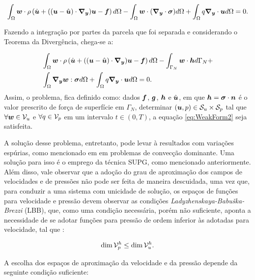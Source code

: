 \begin{equation}
    \int_{\Omega}{\boldsymbol{w}\cdot\rho\left({\dot{\boldsymbol{u}}+((\boldsymbol{u}-\hat{\boldsymbol{u}})\cdot\boldsymbol{\nabla_y})\boldsymbol{u}-\boldsymbol{f}}\right) d\Omega}-\int_{\Omega}{\boldsymbol{w}\cdot(\boldsymbol{\nabla_y}\cdot\boldsymbol{\sigma}) d\Omega}+\int_{\Omega}{q\boldsymbol{\nabla_y}\cdot\boldsymbol{u} d\Omega}=0\text{.}
    \label{eq:WeakForm1}
\end{equation}

Fazendo a integração por partes da parcela que foi separada e considerando o Teorema da Divergência, chega-se a:

\begin{equation}
    \begin{split}
        &\int_{\Omega}{\boldsymbol{w}\cdot\rho\left({\dot{\boldsymbol{u}}+((\boldsymbol{u}-\hat{\boldsymbol{u}})\cdot\boldsymbol{\nabla_y})\boldsymbol{u}-\boldsymbol{f}}\right) d\Omega}-\int_{\Gamma_N}{\boldsymbol{w}\cdot\boldsymbol{h} d\Gamma_N}+\\
        &\int_{\Omega}{\boldsymbol{\nabla_y}\boldsymbol{w}:\boldsymbol{\sigma} d\Omega}+\int_{\Omega}{q\boldsymbol{\nabla_y}\cdot\boldsymbol{u} d\Omega}=0\text{.}
    \end{split}
    \label{eq:WeakForm2}
\end{equation}
Assim, o problema, fica definido como: dados $\boldsymbol{f}$, $\boldsymbol{g}$, $\boldsymbol{h}$ e $\hat{\boldsymbol{u}}$, em que $\boldsymbol{h}=\boldsymbol{\sigma}\cdot\boldsymbol{n}$ é o valor prescrito de força de superfície em $\Gamma_N$, determinar $(\boldsymbol{u},p)\in\mathcal{S}_u\times\mathcal{S}_p$ tal que $\forall\boldsymbol{w}\in\mathcal{V}_u$ e $\forall q\in\mathcal{V}_p$ em um intervalo $t\in(0,T)$, a equação \eqref{eq:WeakForm2} seja satisfeita.

A solução desse problema, entretanto, pode levar à resultados com variações espúrias, como mencionado em \cite{fernandes2020tecnica,donea2003finite,brooks1982streamline} em problemas de convecção dominante. Uma solução para isso é o emprego da técnica SUPG, como mencionado anteriormente. Além disso, vale observar que a adoção do grau de aproximação dos campos de velocidades e de pressões não pode ser feita de maneira descuidada, uma vez que, para conduzir a uma sistema com unicidade de solução, os espaços de funções para velocidade e pressão devem observar as condições \textit{Ladyzhenskaya-Babuška-Brezzi} (LBB), que, como uma condição necessária, porém não suficiente, aponta a necessidade de se adotar funções para pressão de ordem inferior às adotadas para velocidade, tal que \cite{donea2003finite}:

\begin{equation}
    \dim{\mathcal{V}_p^h}\leq\dim{\mathcal{V}_u^h}\text{.}
\end{equation}

A escolha dos espaços de aproximação da velocidade e da pressão depende da seguinte condição suficiente:

